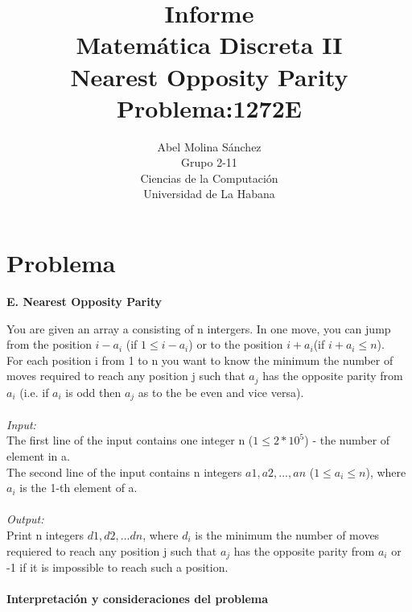 \documentclass[12pt]{article}
\begin{document}
  \title{Informe\\
  Matem\'atica Discreta II\\
     Nearest Opposity Parity\\
     Problema:1272E}
  \author{Abel Molina S\'anchez\\
  Grupo 2-11\\
  Ciencias de la Computaci\'on\\
  Universidad de La Habana}
    \maketitle  

\newpage

\section{Problema}


\begin{center}
\textbf{E. Nearest Opposity Parity}\\
\end{center}

	You are given an array a consisting of n intergers. In one move, you can jump from the position $i-a_i$ (if $1\leq i-a_i$) or to the position $i+a_i $(if $i+a_i\leq n$).\\
	For each position i from 1 to n you want to know the minimum the number of moves required to reach any position j such that $a_j$ has the opposite parity 
from $a_i$  (i.e. if $a_i$ is odd then $a_j$ as to the be even and vice versa).\\
\\
\textit{Input:}\\
The first line of the input contains one integer n ($1\leq 2*10^5$) -  the number of element in a.\\
The second line of the input contains n integers $a1,a2,..., an$ ($1\leq a_i\leq n$), where $a_i$ is the 1-th element of a.\\
\\
\textit{Output:}\\
Print n integers $d1, d2,...dn$, where $d_i$ is the minimum the number of moves requiered to reach any position j such that $a_j$ 
has the opposite parity from $a_i$ or -1 if it is impossible to reach such a position.\\
\\

\textbf{Interpretaci\'on y consideraciones del problema} \\
\end{document}
